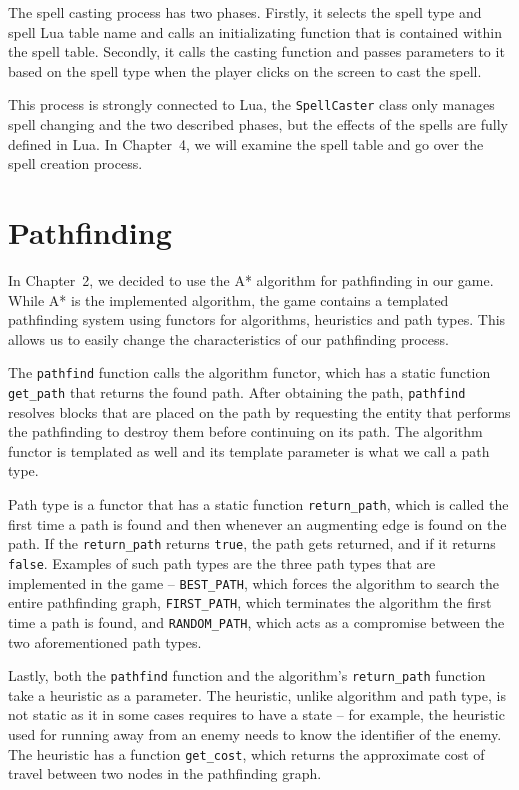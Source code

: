 The spell casting process has two phases. Firstly, it selects the spell type and spell Lua table name and calls an initializating
function that is contained within the spell table. Secondly, it calls the casting function and passes parameters to it based on the spell
type when the player clicks on the screen to cast the spell.

This process is strongly connected to Lua, the \texttt{SpellCaster} class only manages spell changing and the two described phases, but
the effects of the spells are fully defined in Lua. In Chapter~4, we will examine the spell table and go over the spell creation process.

\section{Pathfinding}

In Chapter~2, we decided to use the A* algorithm for pathfinding in our game. While A* is the implemented algorithm, the game contains
a templated pathfinding system using functors for algorithms, heuristics and path types. This allows us to easily change the characteristics
of our pathfinding process. 

The \texttt{pathfind} function calls the algorithm functor, which has a static function \texttt{get\_path} that returns the found path.
After obtaining the path, \texttt{pathfind} resolves blocks that are placed on the path by requesting the entity that performs the
pathfinding to destroy them before continuing on its path. The algorithm functor is templated as well and its template parameter is
what we call a path type.

Path type is a functor that has a static function \texttt{return\_path}, which is called the first time a path is found and then whenever
an augmenting edge is found on the path. If the \texttt{return\_path} returns \texttt{true}, the path gets returned, and if it returns
\texttt{false}. Examples of such path types are the three path types that are implemented in the game -- \texttt{BEST\_PATH}, which forces
the algorithm to search the entire pathfinding graph, \texttt{FIRST\_PATH}, which terminates the algorithm the first time a path is found,
and \texttt{RANDOM\_PATH}, which acts as a compromise between the two aforementioned path types.

Lastly, both the \texttt{pathfind} function and the algorithm's \texttt{return\_path} function take a heuristic as a parameter. The heuristic,
unlike algorithm and path type, is not static as it in some cases requires to have a state -- for example, the heuristic used for running
away from an enemy needs to know the identifier of the enemy. The heuristic has a function \texttt{get\_cost}, which returns the
approximate cost of travel between two nodes in the pathfinding graph.


